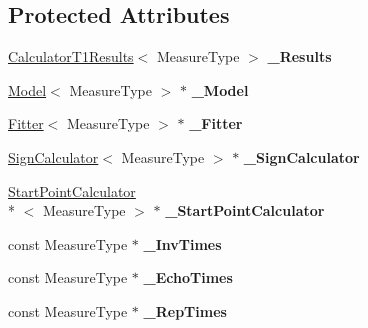 \subsection*{Protected Attributes}
\begin{DoxyCompactItemize}
\item 
\hypertarget{class_ox_1_1_calculator_a33781b22c48568477b0a1ac24d9eae17}{\hyperlink{struct_ox_1_1_calculator_t1_results}{Calculator\-T1\-Results}$<$ Measure\-Type $>$ {\bfseries \-\_\-\-Results}}\label{class_ox_1_1_calculator_a33781b22c48568477b0a1ac24d9eae17}

\item 
\hypertarget{class_ox_1_1_calculator_a37dee4f1bb2fcae66c6710a642fe6d7b}{\hyperlink{class_ox_1_1_model}{Model}$<$ Measure\-Type $>$ $\ast$ {\bfseries \-\_\-\-Model}}\label{class_ox_1_1_calculator_a37dee4f1bb2fcae66c6710a642fe6d7b}

\item 
\hypertarget{class_ox_1_1_calculator_ae00ef8e7db2e9eaa86b8649815246bf9}{\hyperlink{class_ox_1_1_fitter}{Fitter}$<$ Measure\-Type $>$ $\ast$ {\bfseries \-\_\-\-Fitter}}\label{class_ox_1_1_calculator_ae00ef8e7db2e9eaa86b8649815246bf9}

\item 
\hypertarget{class_ox_1_1_calculator_a0655f664d37e70e589bb8526175f19bb}{\hyperlink{class_ox_1_1_sign_calculator}{Sign\-Calculator}$<$ Measure\-Type $>$ $\ast$ {\bfseries \-\_\-\-Sign\-Calculator}}\label{class_ox_1_1_calculator_a0655f664d37e70e589bb8526175f19bb}

\item 
\hypertarget{class_ox_1_1_calculator_a8873b376837e41f40e2a9286a9ea5896}{\hyperlink{class_ox_1_1_start_point_calculator}{Start\-Point\-Calculator}\\*
$<$ Measure\-Type $>$ $\ast$ {\bfseries \-\_\-\-Start\-Point\-Calculator}}\label{class_ox_1_1_calculator_a8873b376837e41f40e2a9286a9ea5896}

\item 
\hypertarget{class_ox_1_1_calculator_ab5f694e40a431677359b6933154eebc0}{const Measure\-Type $\ast$ {\bfseries \-\_\-\-Inv\-Times}}\label{class_ox_1_1_calculator_ab5f694e40a431677359b6933154eebc0}

\item 
\hypertarget{class_ox_1_1_calculator_acc5f2033f9e72e394abae75abdb70076}{const Measure\-Type $\ast$ {\bfseries \-\_\-\-Echo\-Times}}\label{class_ox_1_1_calculator_acc5f2033f9e72e394abae75abdb70076}

\item 
\hypertarget{class_ox_1_1_calculator_acaa46125d5a97260020dcb8e880d8ca4}{const Measure\-Type $\ast$ {\bfseries \-\_\-\-Rep\-Times}}\label{class_ox_1_1_calculator_acaa46125d5a97260020dcb8e880d8ca4}


\end{DoxyCompactItemize}
